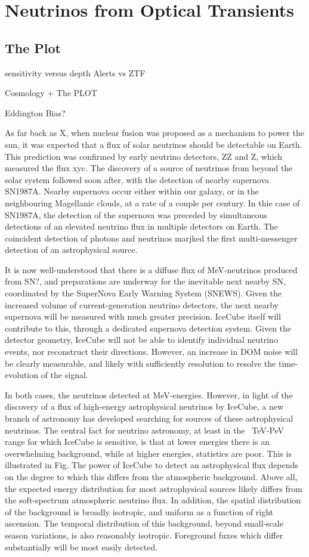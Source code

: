 \section{Neutrinos from Optical Transients}
\subsection{The Plot}
sensitivity versus depth
Alerts vs ZTF

Cosmology + The PLOT

Eddington Bias?

As far back as X, when nuclear fusion was proposed as a mechanism to power the sun, it was expected that a flux of solar neutrinos should be detectable on Earth. This prediction was confirmed by early neutrino detectors, ZZ and Z, which measured the flux xyc.
The discovery of a source of neutrinos from beyond the solar system followed soon after, with the detection of nearby supernova SN1987A. Nearby supernova occur either within our galaxy, or in the neighbouring Magellanic clouds, at a rate of a couple per century. In thie case of SN1987A, the detection of the supernova was preceded by simultaneous detections of an elevated neutrino flux in multiple detectors on Earth. The coincident detection of photons and neutrinos marjked the first multi-messenger detection of an astrophysical source.

It is now well-understood that there is a diffuse flux of MeV-neutrinos produced from SN?, and preparations are underway for the inevitable next nearby SN, coordinated by the SuperNova Early Warning System (SNEWS). Given the increased volume of current-generation neutrino detectors, the next nearby supernova will be measured with much greater precision. IceCube itself will contribute to this, through a dedicated supernova detection system. Given the detector geometry, IceCube will not be able to identify individual neutrino events, nor reconstruct their directions. However, an increase in DOM noise will be clearly measurable, and likely with sufficiently resolution to resolve the time-evolution of the signal. 

In both cases, the neutrinos detected at MeV-energies.  However, in light of the discovery of a flux of high-energy astrophysical neutrinos by IceCube, a new branch of astronomy has developed searching for sources of these astrophysical neutrinos. The central fact for neutrino astronomy, at least in the ~TeV-PeV range for which IceCube is sensitive, is that at lower energies there is an overwhelming background, while at higher energies, statistics are poor. This is illustrated in Fig. The power of IceCube to detect an astrophysical flux depends on the degree to which this differs from the atmospheric background. Above all, the expected energy distribution for most astrophysical sources likely differs from the soft-spectrum atmospheric neutrino flux. In addition, the spatial distribution of the background is broadly isotropic, and uniform as a function of right ascension. The temporal distribution of this background, beyond small-scale season variations, is also reasonably isotropic. Foreground fuxes which differ substantially will be most easily detected.

